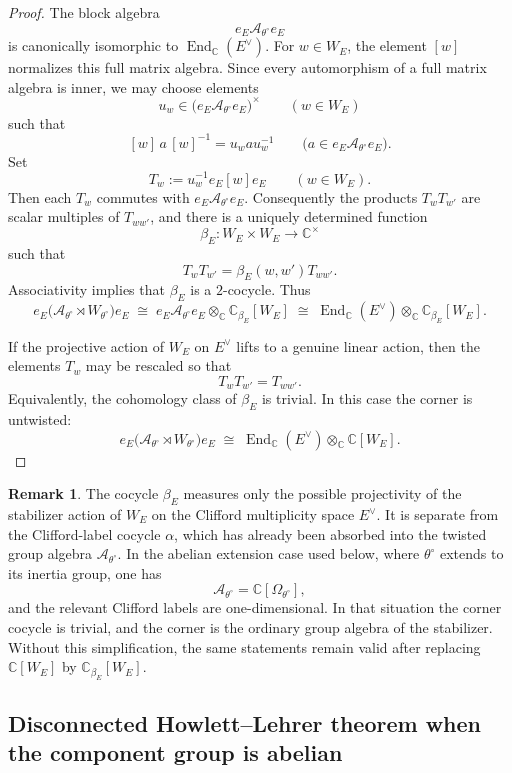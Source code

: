 \documentclass{amsart}
\theoremstyle{plain}
\numberwithin{equation}{section}
\theoremstyle{definition}
\newtheorem{remark}[theorem]{Remark}
\newcommand{\End}{\operatorname{End}}
\newcommand{\cA}{\mathcal{A}}
\newcommand{\C}{\mathbb{C}}
\begin{document}
\begin{proof}
The block algebra
\[
e_E\cA_{\theta^\circ}e_E
\]
is canonically isomorphic to \(\End_\C(E^\vee)\).  For \(w\in W_E\), the element
\([w]\) normalizes this full matrix algebra.  Since every automorphism of a full
matrix algebra is inner, we may choose elements
\[
u_w\in \bigl(e_E\cA_{\theta^\circ}e_E\bigr)^\times
\qquad (w\in W_E)
\]
such that
\[
[w]\,a\,[w]^{-1}=u_w a u_w^{-1}
\qquad
\bigl(a\in e_E\cA_{\theta^\circ}e_E\bigr).
\]
Set
\[
T_w:=u_w^{-1}e_E[w]e_E
\qquad (w\in W_E).
\]
Then each \(T_w\) commutes with \(e_E\cA_{\theta^\circ}e_E\).  Consequently the
products \(T_wT_{w'}\) are scalar multiples of \(T_{ww'}\), and there is a
uniquely determined function
\[
\beta_E:W_E\times W_E\longrightarrow \C^\times
\]
such that
\[
T_wT_{w'}=\beta_E(w,w')T_{ww'}.
\]
Associativity implies that \(\beta_E\) is a \(2\)-cocycle.  Thus
\[
e_E\bigl(\cA_{\theta^\circ}\rtimes W_{\theta^\circ}\bigr)e_E
\;\cong\;
e_E\cA_{\theta^\circ}e_E\otimes_\C \C_{\beta_E}[W_E]
\;\cong\;
\End_\C(E^\vee)\otimes_\C \C_{\beta_E}[W_E].
\]

If the projective action of \(W_E\) on \(E^\vee\) lifts to a genuine linear
action, then the elements \(T_w\) may be rescaled so that
\[
T_wT_{w'}=T_{ww'}.
\]
Equivalently, the cohomology class of \(\beta_E\) is trivial.  In this case the
corner is untwisted:
\[
e_E\bigl(\cA_{\theta^\circ}\rtimes W_{\theta^\circ}\bigr)e_E
\;\cong\;
\End_\C(E^\vee)\otimes_\C \C[W_E].
\]
\end{proof}

\begin{remark}\label{rmk:corner-cocycle}
The cocycle \(\beta_E\) measures only the possible projectivity of the stabilizer
action of \(W_E\) on the Clifford multiplicity space \(E^\vee\).  It is separate
from the Clifford-label cocycle \(\alpha\), which has already been absorbed into the
twisted group algebra \(\cA_{\theta^\circ}\).  In the abelian extension case used
below, where \(\theta^\circ\) extends to its inertia group, one has
\[
\cA_{\theta^\circ}=\C[\Omega_{\theta^\circ}],
\]
and the relevant Clifford labels are one-dimensional.  In that situation the
corner cocycle is trivial, and the corner is the ordinary group algebra of the
stabilizer.  Without this simplification, the same statements remain valid after
replacing \(\C[W_E]\) by \(\C_{\beta_E}[W_E]\).
\end{remark}
\medskip
\subsection{Disconnected Howlett--Lehrer theorem when the component group is abelian}
\label{subsec:disc-HL-abelian}
\end{document}
